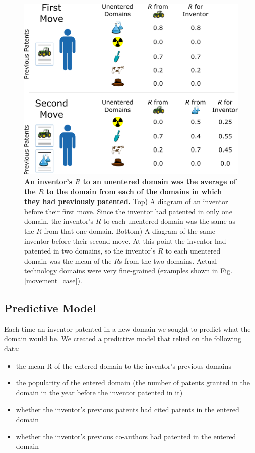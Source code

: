 \documentclass{dsj}
\begin{document}
\begin{figure}
\includegraphics[]{figs/Inventor_R_Diagram.png} 
\caption{\textbf{An inventor's $R$ to an unentered domain was the average of the $R$ to the domain from each of the domains in which they had previously patented.}
Top) A diagram of an inventor before their first move. Since the inventor had patented in only one domain, the inventor's $R$ to each unentered domain was the same as the $R$ from that one domain. 
Bottom) A diagram of the same inventor before their second move. At this point the inventor had patented in two domains, so the inventor's $R$ to each unentered domain was the mean of the $R$s from the two domains.
Actual technology domains were very fine-grained (examples shown in Fig. \ref{movement_case}).
}\label{Inventor_R_Diagram}
\end{figure}

\subsection*{Predictive Model}
Each time an inventor patented in a new domain we sought to predict what the domain would be. 
We created a predictive model that relied on the following data:
\begin{itemize}
    \item the mean R of the entered domain to the inventor’s previous domains
    \item the popularity of the entered domain (the number of patents granted in the domain in the year before the inventor patented in it)
    \item whether the inventor’s previous patents had cited patents in the entered domain
    \item whether the inventor’s previous co-authors had patented in the entered domain
\end{itemize}
\end{document}
